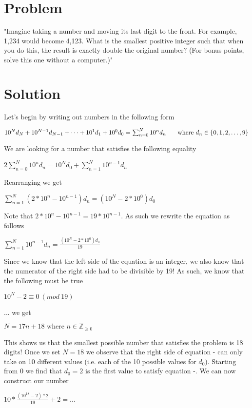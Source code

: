 \documentclass[a4paper,12pt]{article}
\begin{document}
\section{Problem}

"Imagine taking a number and moving its last digit to the front. 
For example, 1,234 would become 4,123. What is the smallest positive 
integer such that when you do this, the result is exactly double the 
original number? (For bonus points, solve this one without a 
computer.)"

\section{Solution}

Let's begin by writing out numbers in the following form\bigskip

$10^Nd_N+10^{N-1}d_{N-1}+\cdots+10^1d_1+10^0d_0=\sum^N_{n=0}10^nd_n 
\newline \indent \mbox{ where }d_n \in \{0,1,2,\ldots,9\}$\bigskip

\noindent We are looking for a number that satisfies the following 
equality\bigskip

$2\sum^N_{n=0}10^nd_n=10^Nd_0+\sum^N_{n=1}10^{n-1}d_n$\bigskip

\noindent Rearranging we get\bigskip

$\sum^N_{n=1}(2*10^n-10^{n-1})d_n=(10^N-2*10^0)d_0$\bigskip

\noindent Note that $2*10^n-10^{n-1}=19*10^{n-1}$.  As such we rewrite 
the equation as follows\bigskip

$\sum^N_{n=1}10^{n-1}d_n=\frac{(10^N-2*10^0)d_0}{19}$\bigskip

\noindent Since we know that the left side of the equation is an 
integer, we also know that the numerator of the right side had to be 
divisible by 19! As such, we know that the following must be true
\bigskip

$10^N-2\equiv0 \ (mod \ 19)$\bigskip

\bigskip

\noindent ... we get\bigskip

$N=17n+18 \mbox{ where } n \in \mathbb{Z}_{\geq 0}$\bigskip

\noindent This shows us that the smallest possible number that 
satisfies the problem is 18 digits!  Once we set $N=18$ we observe 
that the right side of equation - can only take on 10 different values 
(i.e. each of the 10 possible values for $d_0$). Starting from $0$ we 
find that $d_0=2$ is the first value to satisfy equation -.  We can now
 construct our number\bigskip

$10*\frac{(10^{18}-2)*2}{19}+2=\ldots$
\end{document}
